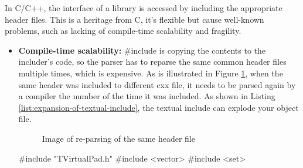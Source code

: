 \documentclass{webofc}
\begin{document}
In C/C++, the interface of a library is accessed by including the appropriate header files. This is a heritage from C, it's flexible but cause well-known problems, such as lacking of compile-time scalability and fragility.

\begin{itemize}
    \item \textbf{Compile-time scalability:}
    \#include is copying the contents to the includer's code, so the parser has to reparse the same common header files multiple times, which is expensive. As is illustrated in Figure \ref{fig:textual_include}, when the same header was included to different cxx file, it needs to be parsed again by a compiler the number of the time it was included. As shown in Listing \ref{list:expansion-of-textual-include}, the textual include can explode your object file.
    
\begin{figure}
\centering
    \begin{minipage}{.3\textwidth}
    \end{minipage}
\caption{Image of re-parsing of the same header file}
\label{fig:textual_include}
\end{figure}

    \begin{listing}[h]
    \noindent
    \begin{minipage}[h]{.48\textwidth}
    \begin{cppcode*}{}
    #include "TVirtualPad.h"
    #include <vector>
    #include <set>


\end{cppcode*}
\end{minipage}
\end{listing}
\end{itemize}
\end{document}
